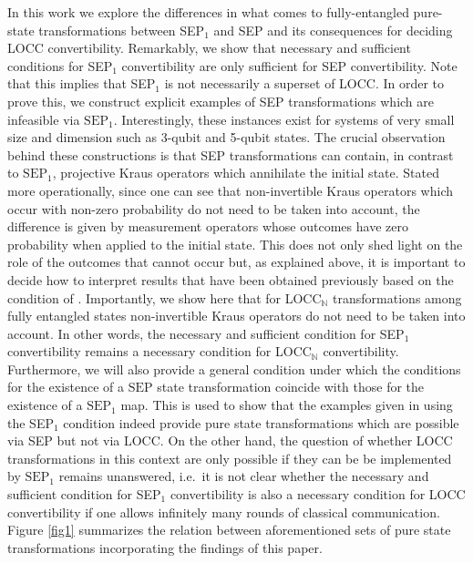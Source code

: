 \documentclass[superscriptaddress,twocolumn]{revtex4}\usepackage[utf8]{inputenc}
\newcommand{\N}{\mathbb{N}}
\begin{document}
In this work we explore the differences in what comes to fully-entangled pure-state transformations between SEP$_1$ and SEP and its consequences for deciding LOCC convertibility. Remarkably, we show that  necessary and sufficient conditions for SEP$_1$ convertibility are only sufficient for SEP convertibility. Note that this implies that SEP$_1$ is not necessarily a superset of LOCC. In order to prove this, we construct explicit examples of SEP transformations which are infeasible via $\textrm{SEP}_1$. Interestingly, these instances exist for systems of very small size and dimension such as 3-qubit and 5-qubit states. The crucial observation behind these constructions is that SEP transformations can contain, in contrast to $\textrm{SEP}_1$, projective Kraus operators which annihilate the initial state. Stated more operationally, since one can see that non-invertible Kraus operators which occur with non-zero probability do not need to be taken into account, the difference is given by measurement operators whose outcomes have zero probability when applied to the initial state. This does not only shed light on the role of the outcomes that cannot occur but, as explained above, it is important to decide how to interpret results that have been obtained previously based on the condition of \cite{GoWa11}. Importantly, we show here that for LOCC$_\N$ transformations among fully entangled states non-invertible Kraus operators do not need to be taken into account. In other words, the necessary and sufficient condition for SEP$_1$ convertibility remains a necessary condition for LOCC$_\mathbb{N}$ convertibility. Furthermore, we will also provide a general condition under which the conditions for the existence of a $\textrm{SEP}$ state transformation coincide with those for the existence of a $\textrm{SEP}_1$ map. This is used to show that the examples given in \cite{HeSp16} using the SEP$_1$ condition indeed provide pure state transformations which are possible via SEP but not via LOCC. On the other hand, the question of whether LOCC transformations in this context are only possible if they can be be implemented by $\textrm{SEP}_1$ remains unanswered, i.e.\ it is not clear whether the necessary and sufficient condition for SEP$_1$ convertibility is also a necessary condition for LOCC convertibility if one allows infinitely many rounds of classical communication. Figure \ref{fig1} summarizes the relation between aforementioned sets of pure state transformations incorporating the findings of this paper.
\end{document}
